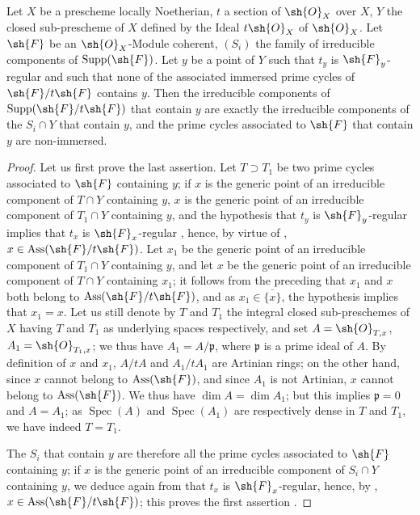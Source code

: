 \begin{proposition}[3.4.4]
\label{IV.3.4.4}
Let $X$ be a prescheme locally Noetherian, $t$ a section of $\sh{O}_X$ over $X$, $Y$ the closed sub-prescheme of $X$ defined by the Ideal $t\sh{O}_X$ of $\sh{O}_X$.
Let $\sh{F}$ be an $\sh{O}_X$-Module coherent, $(S_i)$ the family of irreducible components of $\operatorname{Supp}(\sh{F})$.
Let $y$ be a point of $Y$ such that $t_y$ is $\sh{F}_y$-regular and such that none of the associated immersed prime cycles of $\sh{F}/t\sh{F}$ contains $y$.
Then the irreducible components of $\operatorname{Supp}(\sh{F}/t\sh{F})$ that contain $y$ are exactly the irreducible components of the $S_i\cap Y$ that contain $y$, and the prime cycles associated to $\sh{F}$ that contain $y$ are non-immersed.
\end{proposition}

\begin{proof}
Let us first prove the last assertion.
Let $T\supset T_1$ be two prime cycles associated to $\sh{F}$ containing $y$; if $x$ is the generic point of an irreducible component of $T\cap Y$ containing $y$, $x$ is the generic point of an irreducible component of $T_1\cap Y$ containing $y$, and the hypothesis that $t_y$ is $\sh{F}_y$-regular implies that $t_x$ is $\sh{F}_x$-regular , hence, by virtue of , $x\in\operatorname{Ass}(\sh{F}/t\sh{F})$.
Let $x_1$ be the generic point of an irreducible component of $T_1\cap Y$ containing $y$, and let $x$ be the generic point of an irreducible component of $T\cap Y$ containing $x_1$; it follows from the preceding that $x_1$ and $x$ both belong to $\operatorname{Ass}(\sh{F}/t\sh{F})$, and as $x_1\in\overline{\{x\}}$, the hypothesis implies that $x_1=x$.
Let us still denote by $T$ and $T_1$ the integral closed sub-preschemes of $X$ having $T$ and $T_1$ as underlying spaces respectively, and set $A=\sh{O}_{T,x}$, $A_1=\sh{O}_{T_1,x}$; we thus have $A_1=A/\mathfrak{p}$, where $\mathfrak{p}$ is a prime ideal of $A$.
By definition of $x$ and $x_1$, $A/tA$ and $A_1/tA_1$ are Artinian rings; on the other hand, since $x$ cannot belong to $\operatorname{Ass}(\sh{F})$, and since $A_1$ is not Artinian, $x$ cannot belong to $\operatorname{Ass}(\sh{F})$.
We thus have $\dim A=\dim A_1$; but this implies $\mathfrak{p}=0$ and $A=A_1$; as $\operatorname{Spec}(A)$ and $\operatorname{Spec}(A_1)$ are respectively dense in $T$ and $T_1$, we have indeed $T=T_1$.

The $S_i$ that contain $y$ are therefore all the prime cycles associated to $\sh{F}$ containing $y$; if $x$ is the generic point of an irreducible component of $S_i\cap Y$ containing $y$, we deduce again from  that $t_x$ is $\sh{F}_x$-regular, hence, by , $x\in\operatorname{Ass}(\sh{F}/t\sh{F})$; this proves the first assertion .
\end{proof}

